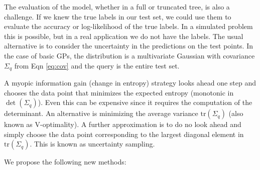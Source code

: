 \documentclass[prd,nofootbib,floatfix,11pt,tightenlines,nofootinbib]{revtex4}
\begin{document}
The evaluation of the model, whether in a full or truncated tree, is also a
challenge.  If we knew the true labels in our test set, we could use them
to evaluate the accuracy or log-likelihood of the true labels.  In a
simulated problem this is possible, but in a real application we do not
have the labels.  The usual alternative is to consider the uncertainty in
the predictions on the test points.  In the case of basic GPs, the
distribution is a multivariate Gaussian with covariance $\Sigma_q$ from
Eqn \ref{eq:cov} and the query is the entire test set.

A myopic information gain (change in entropy) strategy looks ahead one step
and chooses the data point that minimizes the expected entropy (monotonic
in $\det(\Sigma_q)$).  Even this can be expensive since it requires the
computation of the determinant.  An alternative is minimizing the average
variance $\text{tr}(\Sigma_q)$ (also known as V-optimality).  A further
approximation is to do no look ahead and simply choose the data point
corresponding to the largest diagonal element in $\text{tr}(\Sigma_q)$.  This is
known as uncertainty sampling.

We propose the following new methods:
\end{document}
